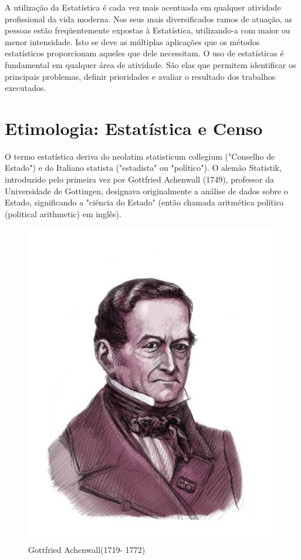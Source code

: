 A utilização da Estatística é cada vez mais acentuada em qualquer atividade profissional da vida moderna. Nos seus mais diversificados ramos de atuação, as pessoas estão freqüentemente expostas à Estatística, utilizando-a com maior ou menor intensidade. Isto se deve as múltiplas aplicações que os métodos estatísticos proporcionam aqueles que dele necessitam. O uso de estatísticas é fundamental em qualquer área de atividade. São elas que permitem identificar os principais problemas, definir prioridades e avaliar o resultado dos trabalhos executados.\vskip0.3cm


\section{Etimologia: Estatística e Censo}

\inic O termo estatística deriva do neolatim statisticum collegium
("Conselho de Estado") e do Italiano statista ("estadista" ou
"político"). O alemão Statistik, introduzido pelo primeira vez por
Gottfried Achenwall (1749), professor da Universidade de
Gottingen, designava originalmente a análise de dados sobre o
Estado, significando a "ciência do Estado" (então chamada
aritmética política (political arithmetic) em inglês). 

\vspace{-6.0cm}
\begin{figure}
\centering
\includegraphics[scale=0.4]{figures/gottfried_achenwall.jpeg}
\vspace{-0.2cm}
\caption{Gottfried Achenwall(1719- 1772)}
\label{fig:my_label8}
\end{figure}






